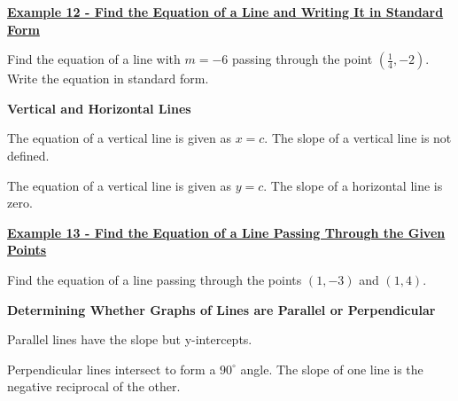 \documentclass[12pt]{book}
\begin{document}
\underline{\textbf{Example 12 - Find the Equation of a Line and Writing It in Standard Form}}

Find the equation of a line with $m=-6$ passing through the point $\left(\frac{1}{4},-2\right)$. Write the equation in standard form.

\vspace{60mm}

{\large \textbf{Vertical and Horizontal Lines}}

\begin{boxR}
    The equation of a vertical line is given as $x=c$. The slope of a vertical line is not defined.

    The equation of a vertical line is given as $y=c$. The slope of a horizontal line is zero.
\end{boxR}

\newpage


\underline{\textbf{Example 13 - Find the Equation of a Line Passing Through the Given Points}}

Find the equation of a line passing through the points $(1,-3)$ and $(1,4)$.

\vspace{60mm}

{\large \textbf{Determining Whether Graphs of Lines are Parallel or Perpendicular}}

Parallel lines have the \underline{\hspace{20mm}} slope but \underline{\hspace{20mm}} y-intercepts.

Perpendicular lines intersect to form a $90^\circ$ angle. The slope of one line is the negative reciprocal of the other. 
\end{document}
